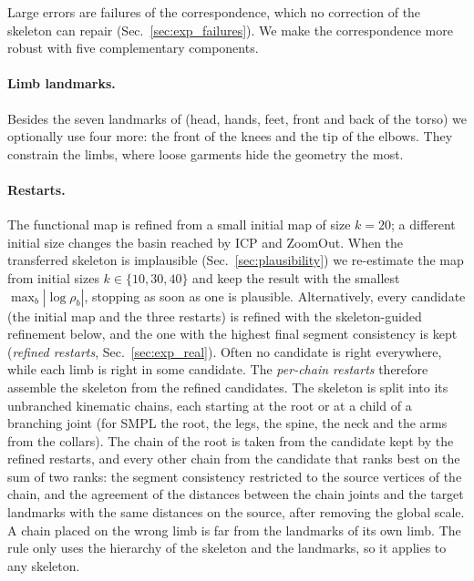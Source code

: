 \documentclass[11pt]{article}
\begin{document}
Large errors are failures of the correspondence, which no correction of the
skeleton can repair (Sec.~\ref{sec:exp_failures}). We make the correspondence
more robust with five complementary components.

\paragraph{Limb landmarks.} Besides the seven landmarks of
\citet{musoni2021functional} (head, hands, feet, front and back of the torso)
we optionally use four more: the front of the knees and the tip of the elbows.
They constrain the limbs, where loose garments hide the geometry the most.

\paragraph{Restarts.} The functional map is refined from a small initial map
of size $k=20$; a different initial size changes the basin reached by ICP and
ZoomOut. When the transferred skeleton is implausible
(Sec.~\ref{sec:plausibility}) we re-estimate the map from initial sizes
$k \in \{10, 30, 40\}$ and keep the result with the smallest
$\max_b |\log \rho_b|$, stopping as soon as one is plausible. Alternatively,
every candidate (the initial map and the three restarts) is refined with the
skeleton-guided refinement below, and the one with the highest final segment
consistency is kept (\emph{refined restarts}, Sec.~\ref{sec:exp_real}).
Often no candidate is right everywhere, while each limb is right in some
candidate. The \emph{per-chain restarts} therefore assemble the skeleton from
the refined candidates. The skeleton is split into its unbranched kinematic
chains, each starting at the root or at a child of a branching joint (for
SMPL the root, the legs, the spine, the neck and the arms from the collars).
The chain of the root is taken from the candidate kept by the refined
restarts, and every other chain from the candidate that ranks best on the sum
of two ranks: the segment consistency restricted to the source vertices of
the chain, and the agreement of the distances between the chain joints and
the target landmarks with the same distances on the source, after removing
the global scale. A chain placed on the wrong limb is far from the landmarks
of its own limb. The rule only uses the hierarchy of the skeleton and the
landmarks, so it applies to any skeleton.
\end{document}
